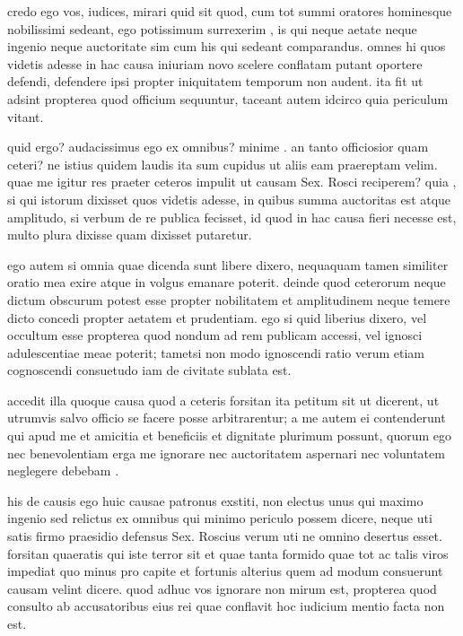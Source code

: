
 credo ego vos, iudices, mirari quid sit quod, cum tot summi oratores hominesque nobilissimi sedeant, ego potissimum surrexerim , is qui neque aetate neque ingenio neque auctoritate sim cum his qui sedeant comparandus. omnes hi quos videtis adesse in hac causa iniuriam novo scelere conflatam putant oportere defendi, defendere ipsi propter iniquitatem temporum non audent. ita fit ut adsint propterea quod officium sequuntur, taceant autem idcirco quia periculum vitant.

 quid ergo? audacissimus ego ex omnibus? minime . an tanto officiosior quam ceteri? ne istius quidem laudis ita sum cupidus ut aliis eam praereptam velim. quae me igitur res praeter ceteros impulit ut causam Sex. Rosci reciperem? quia , si qui istorum dixisset quos videtis adesse, in quibus summa auctoritas est atque amplitudo, si verbum de re publica fecisset, id quod in hac causa fieri necesse est, multo plura dixisse quam dixisset putaretur.

 ego autem si omnia quae dicenda sunt libere dixero, nequaquam tamen similiter oratio mea exire atque in volgus emanare poterit. deinde quod ceterorum neque dictum obscurum potest esse propter nobilitatem et amplitudinem neque temere dicto concedi propter aetatem et prudentiam. ego si quid liberius dixero, vel occultum esse propterea quod nondum ad rem publicam accessi, vel ignosci adulescentiae meae poterit; tametsi non modo ignoscendi ratio verum etiam cognoscendi consuetudo iam de civitate sublata est.

 accedit illa quoque causa quod a ceteris forsitan ita petitum sit ut dicerent, ut utrumvis salvo officio se facere posse arbitrarentur; a me autem ei contenderunt qui apud me et amicitia et beneficiis et dignitate plurimum possunt, quorum ego nec benevolentiam erga me ignorare nec auctoritatem aspernari nec voluntatem neglegere debebam .

 his de causis ego huic causae patronus exstiti, non electus unus qui maximo ingenio sed relictus ex omnibus qui minimo periculo possem dicere, neque uti satis firmo praesidio defensus Sex. Roscius verum uti ne omnino desertus esset. forsitan quaeratis qui iste terror sit et quae tanta formido quae tot ac talis viros impediat quo minus pro capite et fortunis alterius quem ad modum consuerunt causam velint dicere. quod adhuc vos ignorare non mirum est, propterea quod consulto ab accusatoribus eius rei quae conflavit hoc iudicium mentio facta non est.

